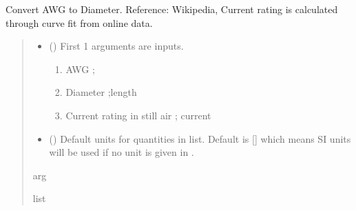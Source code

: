\documentclass[letterpaper,10pt,english]{sphinxmanual}
\begin{document}
\begin{fulllineitems}
\label{\detokenize{components:components.AWG2Dia}}
\pysigstartsignatures
{}
\pysigstopsignatures
\sphinxAtStartPar
Convert AWG to Diameter.
Reference:  Wikipedia, Current rating is calculated through curve fit from online data.
\begin{quote}\begin{description}
\begin{itemize}
\item {}
\sphinxAtStartPar
{} () \textendash{}
\sphinxAtStartPar
First 1 arguments are inputs.
\begin{enumerate}
%
\item {}
\sphinxAtStartPar
AWG ;

\item {}
\sphinxAtStartPar
Diameter ;length

\item {}
\sphinxAtStartPar
Current rating in still air ; current

\end{enumerate}


\item {}
\sphinxAtStartPar
{} (\sphinxstyleliteralemphasis{\sphinxupquote{, }}) \textendash{} Default units for quantities in  list. Default is {[}{]} which means SI units will be used if no unit is given in .

\end{itemize}

\sphinxAtStartPar
arg

\sphinxAtStartPar
list

\end{description}\end{quote}

\end{fulllineitems}

\end{document}
